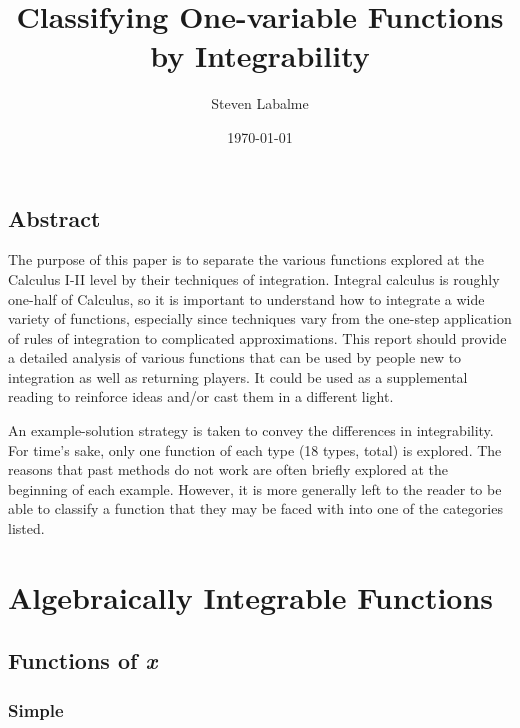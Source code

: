 \documentclass{article}
\title{Classifying One-variable Functions by Integrability}
\author{Steven Labalme}
\date{\today}
\newcounter{example}%
\begin{document}
\maketitle
\newpage

\tableofcontents
\listoffigures
\listoftables
\newpage

\pagestyle{fancy}
\fancyhf{}
\renewcommand{\headrulewidth}{0pt}

\setcounter{secnumdepth}{0}
\begin{center}
\section{Abstract}
\end{center}
The purpose of this paper is to separate the various functions explored at the Calculus I-II level by their techniques of integration. Integral calculus is roughly one-half of Calculus, so it is important to understand how to integrate a wide variety of functions, especially since techniques vary from the one-step application of rules of integration to complicated approximations. This report should provide a detailed analysis of various functions that can be used by people new to integration as well as returning players. It could be used as a supplemental reading to reinforce ideas and/or cast them in a different light.\par
An example-solution strategy is taken to convey the differences in integrability. For time's sake, only one function of each type (18 types, total) is explored. The reasons that past methods do not work are often briefly explored at the beginning of each example. However, it is more generally left to the reader to be able to classify a function that they may be faced with into one of the categories listed.
\newpage



\setcounter{secnumdepth}{3}
\section{Algebraically Integrable Functions}
\subsection{Functions of \emph{x}}
\subsubsection{Simple}
\end{document}
